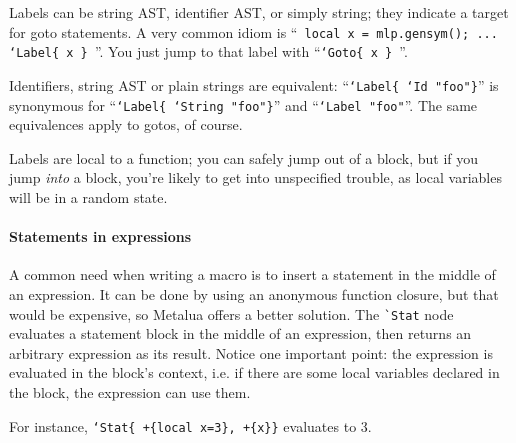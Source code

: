 Labels can be string AST, identifier AST, or simply string; they
indicate a target for goto statements.  A very common idiom is ``{\tt
  local x = mlp.gensym(); ... `Label\{ x \} }''. You just jump to that
label with ``{\tt `Goto\{ x \} }''.

Identifiers, string AST or plain strings are equivalent:
``{\tt`Label\{ `Id "foo"\}}'' is synonymous for ``{\tt`Label\{ `String
  "foo"\}}'' and ``{\tt`Label "foo"}''. The same equivalences apply
to gotos, of course.

Labels are local to a function; you can safely jump out of a block,
but if you jump {\em into} a block, you're likely to get into unspecified
trouble, as local variables will be in a random state.

\paragraph{Statements in expressions}
A common need when writing a macro is to insert a statement in the
middle of an expression. It can be done by using an anonymous function
closure, but that would be expensive, so Metalua offers a better
solution. The \verb|`Stat| node evaluates a statement block in the
middle of an expression, then returns an arbitrary expression as its
result. Notice one important point: the expression is evaluated in
the block's context, i.e. if there are some local variables declared
in the block, the expression can use them.

For instance, {\tt `Stat\{ +\{local x=3\}, +\{x\}\}} evaluates to 3.



